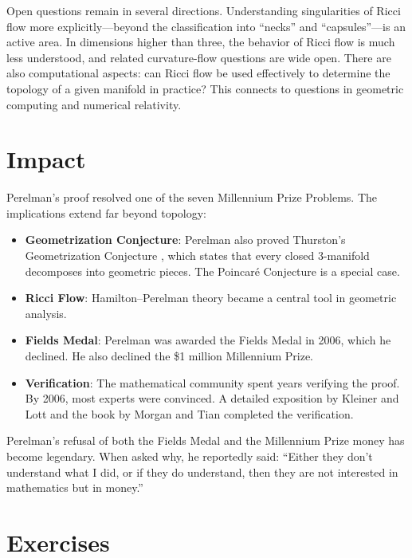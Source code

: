 Open questions remain in several directions. Understanding singularities of Ricci flow more explicitly---beyond the classification into ``necks'' and ``capsules''---is an active area. In dimensions higher than three, the behavior of Ricci flow is much less understood, and related curvature-flow questions are wide open. There are also computational aspects: can Ricci flow be used effectively to determine the topology of a given manifold in practice? This connects to questions in geometric computing and numerical relativity.

\section{Impact}

Perelman's proof resolved one of the seven Millennium Prize Problems. The implications extend far beyond topology:

\begin{itemize}
\item \textbf{Geometrization Conjecture}: Perelman also proved Thurston's Geometrization Conjecture \cite{thurston1982}, which states that every closed 3-manifold decomposes into geometric pieces. The Poincar\'e Conjecture is a special case.
\item \textbf{Ricci Flow}: Hamilton--Perelman theory became a central tool in geometric analysis.
\item \textbf{Fields Medal}: Perelman was awarded the Fields Medal in 2006, which he declined. He also declined the \$1 million Millennium Prize.
\item \textbf{Verification}: The mathematical community spent years verifying the proof. By 2006, most experts were convinced. A detailed exposition by Kleiner and Lott \cite{kleiner2008} and the book by Morgan and Tian \cite{morgan2006} completed the verification.
\end{itemize}

\begin{historicalbox}
Perelman's refusal of both the Fields Medal and the Millennium Prize money has become legendary. When asked why, he reportedly said: ``Either they don't understand what I did, or if they do understand, then they are not interested in mathematics but in money.''
\end{historicalbox}

\section{Exercises}

